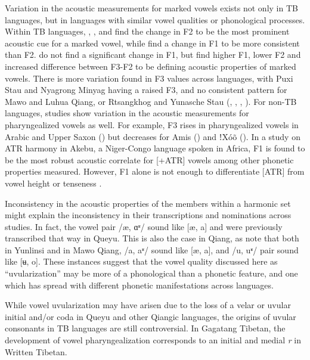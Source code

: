 \documentclass[output=paper]{langscibook}
\begin{document}
Variation in the acoustic measurements for marked vowels exists not only in TB languages, but in languages with similar vowel qualities or phonological processes. Within TB languages, \citet{LinEtAl2012}, \citet{SunEvans2013}, and \citet{Way2018} find the change in F2 to be the most prominent acoustic cue for a marked vowel, while \citet{ChiuSun2020} find a change in F1 to be more consistent than F2. \citet{LinEtAl2012} do not find a significant change in F1, but \citet{EvansEtAl2016} find higher F1, lower F2 and increased difference between F3-F2 to be defining acoustic properties of marked vowels. There is more variation found in F3 values across languages, with Puxi Stau and Nyagrong Minyag having a raised F3, and no consistent pattern for Mawo and Luhua Qiang, or Rtsangkhog and Yunasche Stau (\citealt{LinEtAl2012}, \citealt{EvansEtAl2016}, \citealt{Way2018}, \citealt{ChiuSun2020}). For non-TB languages, studies show variation in the acoustic measurements for pharyngealized vowels as well. For example, F3 rises in pharyngealized vowels in Arabic \citep{Yeou2001} and Upper Saxon (\citealt{KhanWeise2013}) but decreases for Amis (\citealt{MaddiesonWright1995}) and ǃXóõ (\citealt{LadefogedMaddieson1996}). In a study on ATR harmony in Akebu, a Niger-Congo language spoken in Africa, F1 is found to be the most robust acoustic correlate for [+ATR] vowels among other phonetic properties measured. However, F1 alone is not enough to differentiate [ATR] from vowel height or tenseness \citep{Makeeva_and_Kuznetsova_2022}. 

Inconsistency in the acoustic properties of the members within a harmonic set might explain the inconsistency in their transcriptions and nominations across studies. In fact, the vowel pair /æ, ɑʶ/ sound like [æ, a] and were previously transcribed that way in Queyu. This is also the case in Qiang, as \citet[5]{EvansEtAl2016} note that both in Yunlinsi and in Mawo Qiang, /a, aʶ/ sound like [æ, a], and /u, uʶ/ pair sound like [ʉ, o]. These instances suggest that the vowel quality discussed here as “uvularization” may be more of a phonological than a phonetic feature, and one which has spread with different phonetic manifestations across languages.

While vowel uvularization may have arisen due to the loss of a velar or uvular initial and/or coda in Queyu and other Qiangic languages, the origins of uvular consonants in TB languages are still controversial. In Gagatang Tibetan, the development of vowel pharyngealization corresponds to an initial and medial \textit{r} in Written Tibetan. 
\end{document}

